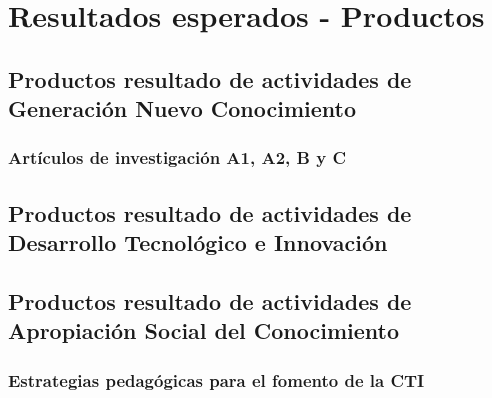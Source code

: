 
\section{Resultados esperados - Productos}

 
\subsection{Productos resultado de actividades de Generación Nuevo
  Conocimiento} 

\subsubsection{Art\'iculos de investigaci\'on A1, A2, B y C}

\subsection{Productos resultado de actividades de Desarrollo
  Tecnol\'ogico e Innovaci\'on} 

\subsection{Productos resultado de actividades de Apropiación Social
  del Conocimiento} 

\subsubsection{Estrategias pedag\'ogicas para el fomento de la CTI}

